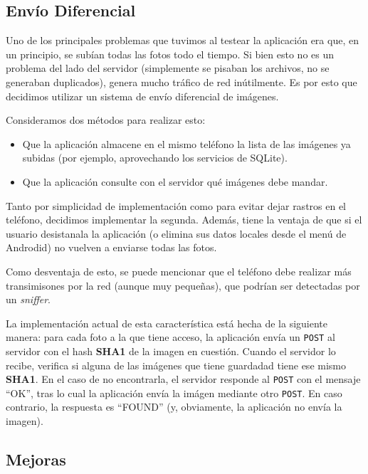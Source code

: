 
\subsection{Envío Diferencial} %
\label{ssub:Envío Diferencial}
Uno de los principales problemas que tuvimos al testear la aplicación era que, en un principio, se subían todas las fotos todo el tiempo. Si bien esto no es un problema del lado del servidor (simplemente se pisaban los archivos, no se generaban duplicados), genera mucho tráfico de red inútilmente. Es por esto que decidimos utilizar un sistema de envío diferencial de imágenes. 

Consideramos dos métodos para realizar esto:
\begin{itemize}
	\item Que la aplicación almacene en el mismo teléfono la lista de las imágenes ya subidas (por ejemplo, aprovechando los servicios de SQLite).
	\item Que la aplicación consulte con el servidor qué imágenes debe mandar. 
\end{itemize}

Tanto por simplicidad de implementación como para evitar dejar rastros en el teléfono, decidimos implementar la segunda. Además, tiene la ventaja de que si el usuario desistanala la aplicación (o elimina sus datos locales desde el menú de Androdid) no vuelven a enviarse todas las fotos. 

Como desventaja de esto, se puede mencionar que el teléfono debe realizar más transimisones por la red (aunque muy pequeñas), que podrían ser detectadas por un \emph{sniffer}.


La implementación actual de esta característica está hecha de la siguiente manera: para cada foto a la que tiene acceso, la aplicación envía un \texttt{POST} al servidor con el hash \textbf{SHA1} de la imagen en cuestión. Cuando el servidor lo recibe, verifica si alguna de las imágenes que tiene guardadad tiene ese mismo \textbf{SHA1}. En el caso de no encontrarla, el servidor responde al \texttt{POST} con el mensaje ``OK'', tras lo cual la aplicación envía la imágen mediante otro \texttt{POST}.
En caso contrario, la respuesta es ``FOUND'' (y, obviamente, la aplicación no envía la imagen).

\subsection{Mejoras} %

